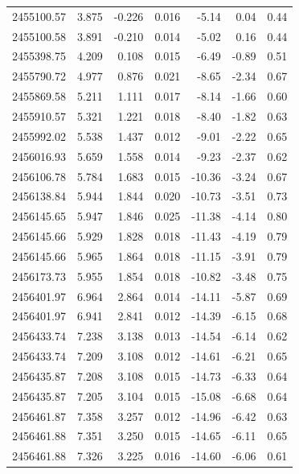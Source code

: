 \begin{small}
\begin{longtable}{lrrrrrr}
 2455100.57 &   3.875 &  -0.226 &   0.016 &    -5.14 &     0.04 &     0.44 \\
 2455100.58 &   3.891 &  -0.210 &   0.014 &    -5.02 &     0.16 &     0.44 \\
 2455398.75 &   4.209 &   0.108 &   0.015 &    -6.49 &    -0.89 &     0.51 \\
 2455790.72 &   4.977 &   0.876 &   0.021 &    -8.65 &    -2.34 &     0.67 \\
 2455869.58 &   5.211 &   1.111 &   0.017 &    -8.14 &    -1.66 &     0.60 \\
 2455910.57 &   5.321 &   1.221 &   0.018 &    -8.40 &    -1.82 &     0.63 \\
 2455992.02 &   5.538 &   1.437 &   0.012 &    -9.01 &    -2.22 &     0.65 \\
 2456016.93 &   5.659 &   1.558 &   0.014 &    -9.23 &    -2.37 &     0.62 \\
 2456106.78 &   5.784 &   1.683 &   0.015 &   -10.36 &    -3.24 &     0.67 \\
 2456138.84 &   5.944 &   1.844 &   0.020 &   -10.73 &    -3.51 &     0.73 \\
 2456145.65 &   5.947 &   1.846 &   0.025 &   -11.38 &    -4.14 &     0.80 \\
 2456145.66 &   5.929 &   1.828 &   0.018 &   -11.43 &    -4.19 &     0.79 \\
 2456145.66 &   5.965 &   1.864 &   0.018 &   -11.15 &    -3.91 &     0.79 \\
 2456173.73 &   5.955 &   1.854 &   0.018 &   -10.82 &    -3.48 &     0.75 \\
 2456401.97 &   6.964 &   2.864 &   0.014 &   -14.11 &    -5.87 &     0.69 \\
 2456401.97 &   6.941 &   2.841 &   0.012 &   -14.39 &    -6.15 &     0.68 \\
 2456433.74 &   7.238 &   3.138 &   0.013 &   -14.54 &    -6.14 &     0.62 \\
 2456433.74 &   7.209 &   3.108 &   0.012 &   -14.61 &    -6.21 &     0.65 \\
 2456435.87 &   7.208 &   3.108 &   0.015 &   -14.73 &    -6.33 &     0.64 \\
 2456435.87 &   7.205 &   3.104 &   0.015 &   -15.08 &    -6.68 &     0.64 \\
 2456461.87 &   7.358 &   3.257 &   0.012 &   -14.96 &    -6.42 &     0.63 \\
 2456461.88 &   7.351 &   3.250 &   0.015 &   -14.65 &    -6.11 &     0.65 \\
 2456461.88 &   7.326 &   3.225 &   0.016 &   -14.60 &    -6.06 &     0.61 \\

\end{longtable}
\end{small}

